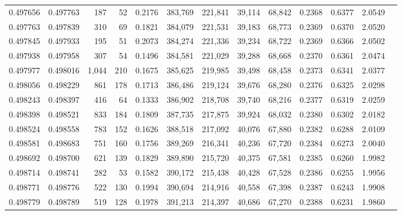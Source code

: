 \begin{tabular}{rrrrrrrrrrrrr}
0.497656 & 0.497763 &   187 &    52 &                                     0.2176 & 383,769 & 221,841 &  39,114 &  68,842 & 0.2368 & 0.6377 & 2.0549 \\
0.497763 & 0.497839 &   310 &    69 &                                     0.1821 & 384,079 & 221,531 &  39,183 &  68,773 & 0.2369 & 0.6370 & 2.0520 \\
0.497845 & 0.497933 &   195 &    51 &                                     0.2073 & 384,274 & 221,336 &  39,234 &  68,722 & 0.2369 & 0.6366 & 2.0502 \\
0.497938 & 0.497958 &   307 &    54 &                                     0.1496 & 384,581 & 221,029 &  39,288 &  68,668 & 0.2370 & 0.6361 & 2.0474 \\
0.497977 & 0.498016 & 1,044 &   210 &                                     0.1675 & 385,625 & 219,985 &  39,498 &  68,458 & 0.2373 & 0.6341 & 2.0377 \\
0.498056 & 0.498229 &   861 &   178 &                                     0.1713 & 386,486 & 219,124 &  39,676 &  68,280 & 0.2376 & 0.6325 & 2.0298 \\
0.498243 & 0.498397 &   416 &    64 &                                     0.1333 & 386,902 & 218,708 &  39,740 &  68,216 & 0.2377 & 0.6319 & 2.0259 \\
0.498398 & 0.498521 &   833 &   184 &                                     0.1809 & 387,735 & 217,875 &  39,924 &  68,032 & 0.2380 & 0.6302 & 2.0182 \\
0.498524 & 0.498558 &   783 &   152 &                                     0.1626 & 388,518 & 217,092 &  40,076 &  67,880 & 0.2382 & 0.6288 & 2.0109 \\
0.498581 & 0.498683 &   751 &   160 &                                     0.1756 & 389,269 & 216,341 &  40,236 &  67,720 & 0.2384 & 0.6273 & 2.0040 \\
0.498692 & 0.498700 &   621 &   139 &                                     0.1829 & 389,890 & 215,720 &  40,375 &  67,581 & 0.2385 & 0.6260 & 1.9982 \\
0.498714 & 0.498741 &   282 &    53 &                                     0.1582 & 390,172 & 215,438 &  40,428 &  67,528 & 0.2386 & 0.6255 & 1.9956 \\
0.498771 & 0.498776 &   522 &   130 &                                     0.1994 & 390,694 & 214,916 &  40,558 &  67,398 & 0.2387 & 0.6243 & 1.9908 \\
0.498779 & 0.498789 &   519 &   128 &                                     0.1978 & 391,213 & 214,397 &  40,686 &  67,270 & 0.2388 & 0.6231 & 1.9860 \\

\end{tabular}
